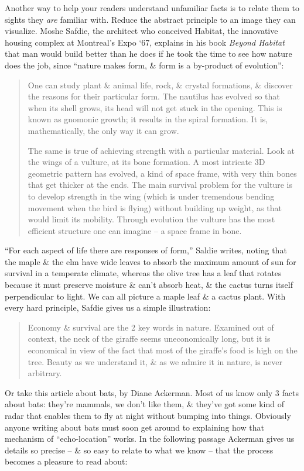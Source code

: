 \documentclass{article}
\begin{document}
Another way to help your readers understand unfamiliar facts is to relate them to sights they \textit{are} familiar with. Reduce the abstract principle to an image they can visualize. Moshe Safdie, the architect who conceived Habitat, the innovative housing complex at Montreal's Expo `67, explains in his book \textit{Beyond Habitat} that man would build better than he does if he took the time to see how nature does the job, since ``nature makes form, \& form is a by-product of evolution'':
\begin{quotation}
	One can study plant \& animal life, rock, \& crystal formations, \& discover the reasons for their particular form. The nautilus has evolved so that when its shell grows, its head will not get stuck in the opening. This is known as gnomonic growth; it results in the spiral formation. It is, mathematically, the only way it can grow.
	
	The same is true of achieving strength with a particular material. Look at the wings of a vulture, at its bone formation. A most intricate 3D geometric pattern has evolved, a kind of space frame, with very thin bones that get thicker at the ends. The main survival problem for the vulture is to develop strength in the wing (which is under tremendous bending movement when the bird is flying) without building up weight, as that would limit its mobility. Through evolution the vulture has the most efficient structure one can imagine -- a space frame in bone.
\end{quotation}
``For each aspect of life there are responses of form,'' Saldie writes, noting that the maple \& the elm have wide leaves to absorb the maximum amount of sun for survival in a temperate climate, whereas the olive tree has a leaf that rotates because it must preserve moisture \& can't absorb heat, \& the cactus turns itself perpendicular to light. We can all picture a maple leaf \& a cactus plant. With every hard principle, Safdie gives us a simple illustration:
\begin{quotation}
	Economy \& survival are the 2 key words in nature. Examined out of context, the neck of the giraffe seems uneconomically long, but it is economical in view of the fact that most of the giraffe's food is high on the tree. Beauty as we understand it, \& as we admire it in nature, is never arbitrary.
\end{quotation}
Or take this article about bats, by Diane Ackerman. Most of us know only 3 facts about bats: they're mammals, we don't like them, \& they've got some kind of radar that enables them to fly at night without bumping into things. Obviously anyone writing about bats must soon get around to explaining how that mechanism of ``echo-location'' works. In the following passage Ackerman gives us details so precise -- \& so easy to relate to what we know -- that the process becomes a pleasure to read about:
\end{document}
